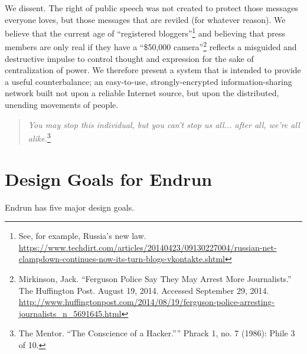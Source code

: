 \documentclass[12pt]{article}
\begin{document}
  We dissent. The right of public speech was not created to protect those messages everyone loves, but those messages that are reviled (for whatever reason). We believe that the current age of ``registered bloggers''\footnote{See, for example, Russia's new law. \url{https://www.techdirt.com/articles/20140423/09130227004/russian-net-clampdown-continues-now-its-turn-blogs-vkontakte.shtml}} and believing that press members are only real if they have a ``\$50,000 camera''\footnote{Mirkinson, Jack. ``Ferguson Police Say They May Arrest More Journalists.'' The Huffington Post. August 19, 2014. Accessed September 29, 2014. \url{http://www.huffingtonpost.com/2014/08/19/ferguson-police-arresting-journalists_n_5691645.html}} reflects a misguided and destructive impulse to control thought and expression for the sake of centralization of power. We therefore present a system that is intended to provide a useful counterbalance; an easy-to-use, strongly-encrypted information-sharing network built not upon a reliable Internet source, but upon the distributed, unending movements of people. 
  
  \begin{quote}
    \emph{You may stop this individual, but you can't stop us all... after all, we're all alike.}\footnote{The Mentor. ``The Conscience of a Hacker.'''' Phrack 1, no. 7 (1986): Phile 3 of 10.}
  \end{quote}
  
  \section{Design Goals for Endrun}
  
  Endrun has five major design goals.
  
\end{document}
